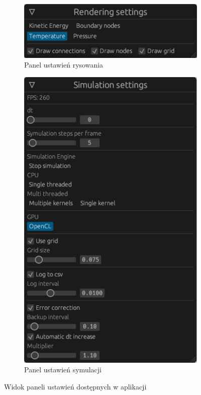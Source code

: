 \documentclass[12pt, letterpaper]{report}
\begin{document}
    \begin{figure}[H]
        \centering
        \begin{subfigure}[t]{0.4\textwidth}
            \includegraphics[width=\textwidth]{render_settings.png} 
            \caption{Panel ustawień rysowania}
        \end{subfigure}
        \begin{subfigure}[t]{0.4\textwidth}
            \includegraphics[width=\textwidth]{simulation_settings.png}
            \caption{Panel ustawień symulacji}
        \end{subfigure}
        \caption{Widok paneli ustawień dostępnych w aplikacji}
    \end{figure}
\end{document}
